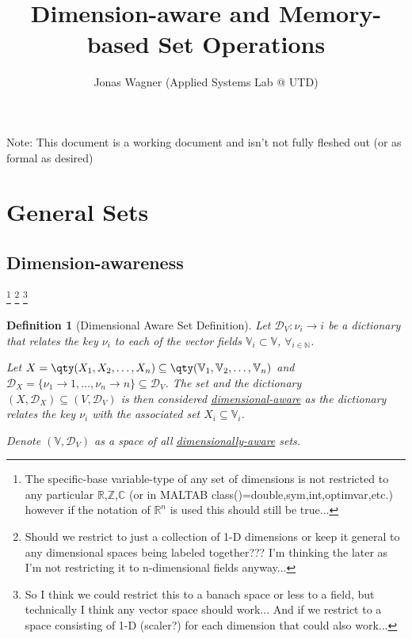 \documentclass[11pt]{article}
\title{Dimension-aware and Memory-based Set Operations}
\author{Jonas Wagner (Applied Systems Lab @ UTD)}
\date{}
\newtheorem{definition}{Definition}
\newcommand{\R}{\mathbb{R}} %
\newcommand{\C}{\mathbb{C}} %
\newcommand{\N}{\mathbb{N}} %
\newcommand{\Z}{\mathbb{Z}} %
\newcommand{\V}{\mathbb{V}} %
\newcommand{\Key}{\nu} %
\newcommand{\Dict}{\mathcal{D}} %
\begin{document}
Note:
This document is a working document and isn't not fully fleshed out (or as formal as desired)

\section{General Sets}

\subsection{Dimension-awareness}
\footnote{
	The specific-base variable-type of any set of dimensions is not restricted to any particular $\R$,$\Z$,$\C$ (or in MALTAB class()=double,sym,int,optimvar,etc.) however if the notation of $\R^n$ is used this should still be true...
} 
\footnote{
	Should we restrict to just a collection of 1-D dimensions or keep it general to any dimensional spaces being labeled together???
	I'm thinking the later as I'm not restricting it to n-dimensional fields anyway...
} 
\footnote{
	So I think we could restrict this to a banach space or less to a field, but technically I think any vector space should work...
	And if we restrict to a space consisting of 1-D (scaler?) for each dimension that could also work...
}	

\begin{definition}[Dimensional Aware Set Definition]
	
	Let $\Dict_{V} : \Key_{i} \to {i}$ be a dictionary that relates the key $\Key_{i}$ to each of the vector fields $\V_{i} \subset \V$, $\forall_{i \in \N}$.

	Let $X = \qty(X_{1},X_{2},\dots,X_{n}) \subseteq \qty(\V_{1}, \V_{2}, \dots, \V_{n})$ and $\Dict_{X} = \{\Key_{1} \to 1,\dots,\Key_{n} \to n\} \subseteq \Dict_{V}$.
	The set and the dictionary $(X,\Dict_{X}) \subseteq (V,\Dict_{V})$ is then considered \emph{\underline{dimensional-aware}} as the dictionary relates the key $\Key_{i}$ with the associated set $X_{i} \subseteq \V_{i}$.
	
	Denote $(\V,\Dict_{V})$ as a space of all \emph{\underline{dimensionally-aware}} sets.
\end{definition}
\end{document}
